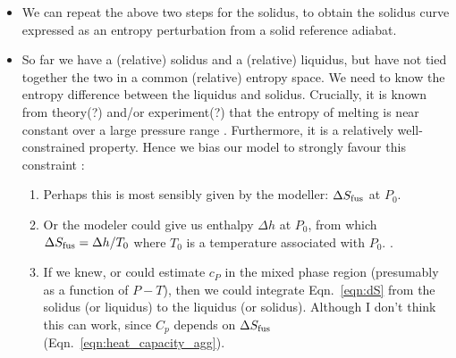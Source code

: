 \begin{itemize}
\item We can repeat the above two steps for the solidus, to obtain the solidus curve expressed as an entropy perturbation from a solid reference adiabat.
\item So far we have a (relative) solidus and a (relative) liquidus, but have not tied together the two in a common (relative) entropy space.  We need to know the entropy difference between the liquidus and solidus.  Crucially, it is known from theory(?) and/or experiment(?)  that the entropy of melting is  near constant over a large pressure range  .  Furthermore, it is a relatively well-constrained property.  Hence we bias our model to strongly favour this constraint :
\begin{enumerate}
\item Perhaps this is most sensibly given by the modeller: $\Delta S_{\rm fus}$ at $P_0$.
\item Or the modeler could give us enthalpy $\Delta h$ at $P_0$, from which $\Delta S_{\rm fus} = \Delta h / T_0$ where $T_0$ is a temperature associated with $P_0$.   .
\item If we knew, or could estimate $c_P$ in the mixed phase region (presumably as a function of $P-T$), then we could integrate Eqn.~\ref{eqn:dS} from the solidus (or liquidus) to the liquidus (or solidus).  Although I don't think this can work, since $C_p$ depends on $\Delta S_{\rm fus}$ (Eqn.~\ref{eqn:heat_capacity_agg}).

\end{enumerate}
\end{itemize}
